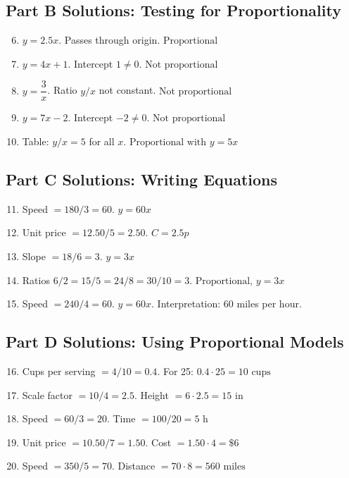 \documentclass[14pt]{extarticle}
\begin{document}
\subsection*{Part B Solutions: Testing for Proportionality}
\begin{enumerate}
  \setcounter{enumi}{5}
  \item \(y=2.5x\). Passes through origin. \(\boxed{\text{Proportional}}\)
  \item \(y=4x+1\). Intercept \(1\neq0\). \(\boxed{\text{Not proportional}}\)
  \item \(y=\dfrac{3}{x}\). Ratio \(y/x\) not constant. \(\boxed{\text{Not proportional}}\)
  \item \(y=7x-2\). Intercept \(-2\neq0\). \(\boxed{\text{Not proportional}}\)
  \item Table: \(y/x=5\) for all \(x\). \(\boxed{\text{Proportional with } y=5x}\)
\end{enumerate}

\subsection*{Part C Solutions: Writing Equations}
\begin{enumerate}
  \setcounter{enumi}{10}
  \item Speed \(=180/3=60\). \(\boxed{y=60x}\)
  \item Unit price \(=12.50/5=2.50\). \(\boxed{C=2.5p}\)
  \item Slope \(=18/6=3\). \(\boxed{y=3x}\)
  \item Ratios \(6/2=15/5=24/8=30/10=3\). \(\boxed{\text{Proportional, } y=3x}\)
  \item Speed \(=240/4=60\). \(\boxed{y=60x}\). Interpretation: 60 miles per hour.
\end{enumerate}

\subsection*{Part D Solutions: Using Proportional Models}
\begin{enumerate}
  \setcounter{enumi}{15}
  \item Cups per serving \(=4/10=0.4\). For 25: \(0.4\cdot25=\boxed{10\text{ cups}}\)
  \item Scale factor \(=10/4=2.5\). Height \(=6\cdot2.5=\boxed{15\text{ in}}\)
  \item Speed \(=60/3=20\). Time \(=100/20=\boxed{5\text{ h}}\)
  \item Unit price \(=10.50/7=1.50\). Cost \(=1.50\cdot4=\boxed{\$6}\)
  \item Speed \(=350/5=70\). Distance \(=70\cdot8=\boxed{560\text{ miles}}\)
\end{enumerate}
\end{document}
